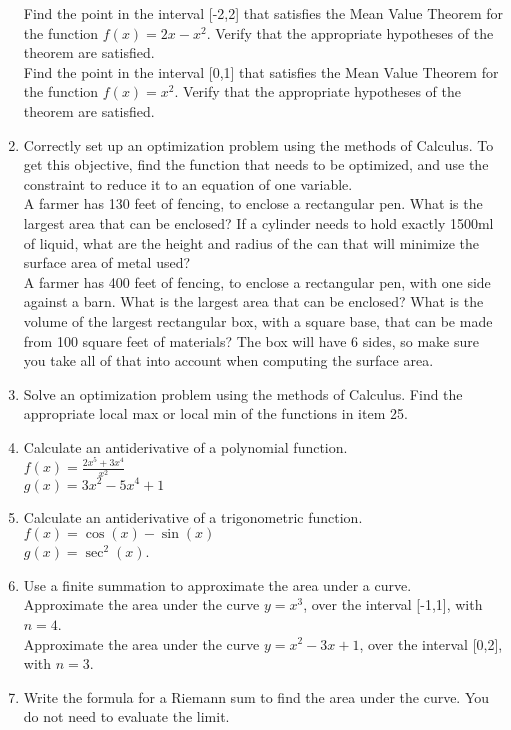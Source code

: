 \documentclass{exam}
\begin{document}
\begin{enumerate}
Find the point in the interval [-2,2] that satisfies the Mean Value Theorem for the function $f(x) = 2x-x^2$. Verify that the appropriate hypotheses of the theorem are satisfied.\\
Find the point in the interval [0,1] that satisfies the Mean Value Theorem for the function $f(x) = x^2$. Verify that the appropriate hypotheses of the theorem are satisfied.
\item Correctly set up an optimization problem using the methods of Calculus. To get this objective, find the function that needs to be optimized, and use the constraint to reduce it to an equation of one variable.\\
A farmer has 130 feet of fencing, to enclose a rectangular pen. What is the largest area that can be enclosed?
If a cylinder needs to hold exactly 1500ml of liquid, what are the height and radius of the can that will minimize the surface area of metal used?\\
A farmer has 400 feet of fencing, to enclose a rectangular pen, with one side against a barn. What is the largest area that can be enclosed?
What is the volume of the largest rectangular box, with a square base, that can be made from 100 square feet of materials? The box will have 6 sides, so make sure you take all of that into account when computing the surface area.
\item Solve an optimization problem using the methods of Calculus. Find the appropriate local max or local min of the functions in item 25.\\
\item Calculate an antiderivative of a polynomial function.\\
$f(x) = \frac{2x^5 + 3x^4}{x^2}$\\
$g(x) = 3x^2 - 5x^4 + 1$
\item Calculate an antiderivative of a trigonometric function.\\
$f(x) = \cos(x) - \sin(x)$\\
$g(x) = \sec^2(x)$.
\item Use a finite summation to approximate the area under a curve.\\
Approximate the area under the curve $y = x^3$, over the interval [-1,1], with $n=4$. \\
Approximate the area under the curve $y = x^2 - 3x +1$, over the interval [0,2], with $n=3$. 
\item Write the formula for a Riemann sum to find the area under the curve. You do not need to evaluate the limit.\\

\end{enumerate}
\end{document}
